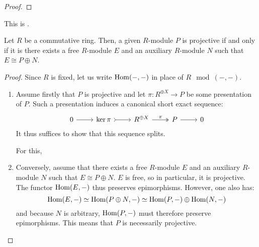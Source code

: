                 \begin{lemma} \label{lemma: epimorphisms_into_projectives_split}
                
                \end{lemma}
                    \begin{proof}
                        
                    \end{proof}
                \begin{proposition} \label{prop: projective_modules_are_direct_summands_of_free_modules}
                    This is \cite[Proposition VIII.6.4]{chapter0}.
                        
                    Let $R$ be a commutative ring. Then, a given $R$-module $P$ is projective if and only if it is there exists a free $R$-module $E$ and an auxiliary $R$-module $N$ such that $E \cong P \oplus N$.
                \end{proposition}
                    \begin{proof}
                        Since $R$ is fixed, let us write $\mathrm{Hom}(-, -)$ in place of $R\mod(-, -)$. 
                        \begin{enumerate}
                            \item Assume firstly that $P$ is projective and let $\pi: R^{\oplus X} \to P$ be some presentation of $P$. Such a presentation induces a canonical short exact sequence:
                                $$
                                    \begin{tikzcd}
                                    	0 & {\ker \pi} & {R^{\oplus X}} & P & 0
                                    	\arrow[from=1-1, to=1-2]
                                    	\arrow[tail, from=1-2, to=1-3]
                                    	\arrow["\pi", two heads, from=1-3, to=1-4]
                                    	\arrow[from=1-4, to=1-5]
                                    \end{tikzcd}
                                $$
                            It thus suffices to show that this sequence splits. 
                            
                            For this, 
                            \item Conversely, assume that there exists a free $R$-module $E$ and an auxiliary $R$-module $N$ such that $E \cong P \oplus N$. $E$ is free, so in particular, it is projective. The functor $\mathrm{Hom}(E, -)$ thus preserves epimorphisms. However, one also has:
                                $$\mathrm{Hom}(E, -) \simeq \mathrm{Hom}(P \oplus N, -) \simeq \mathrm{Hom}(P, -) \oplus \mathrm{Hom}(N, -)$$
                            and because $N$ is arbitrary, $\mathrm{Hom}(P, -)$ must therefore preserve epimorphisms. This means that $P$ is necessarily projective. 
                        \end{enumerate}
                    \end{proof}

